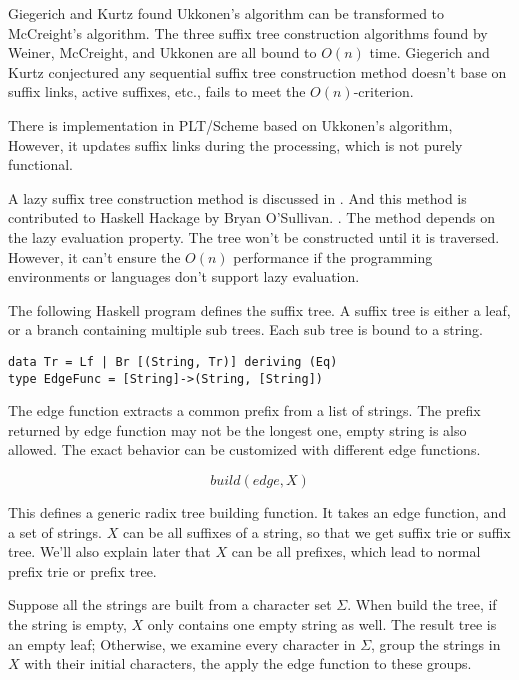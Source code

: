 \documentclass{article}
\begin{document}
Giegerich and Kurtz found Ukkonen's algorithm
can be transformed to McCreight's algorithm\cite{GieKur97}.
The three suffix tree construction algorithms found by
Weiner, McCreight, and Ukkonen are all bound to $O(n)$ time.
Giegerich and Kurtz conjectured any sequential
suffix tree construction method doesn't base on
suffix links, active suffixes, etc., fails to meet the
$O(n)$-criterion.

There is implementation in PLT/Scheme\cite{plt-stree} based on
Ukkonen's algorithm, However, it updates suffix links during the
processing, which is not purely functional.

A lazy suffix tree construction method is discussed in \cite{GieKur95}.
And this method is contributed to Haskell Hackage by Bryan O'Sullivan.
\cite{Hackage-STree}. The method depends on the lazy evaluation property.
The tree won't be constructed until it is traversed.
However, it can't ensure the $O(n)$ performance
if the programming environments or languages don't support
lazy evaluation.

The following Haskell program defines the suffix tree. A suffix tree
is either a leaf, or a branch containing multiple sub trees. Each
sub tree is bound to a string.

\lstset{language=Haskell}
\begin{lstlisting}
data Tr = Lf | Br [(String, Tr)] deriving (Eq)
type EdgeFunc = [String]->(String, [String])
\end{lstlisting}

The edge function extracts a common prefix from a list of strings.
The prefix returned by edge function may not be the longest one,
empty string is also allowed. The exact behavior can be customized
with different edge functions.

\[
build(edge, X)
\]

This defines a generic radix tree building function. It takes an
edge function, and a set of strings. $X$ can be all suffixes of
a string, so that we get suffix trie or suffix tree. We'll also
explain later that $X$ can be all prefixes, which lead to normal
prefix trie or prefix tree.

Suppose all the strings are built from a character set $\Sigma$.
When build the tree, if the string is empty, $X$ only contains
one empty string as well. The result tree is an empty leaf;
Otherwise, we examine every character in $\Sigma$, group
the strings in $X$ with their initial characters, the apply
the edge function to these groups.
\end{document}
